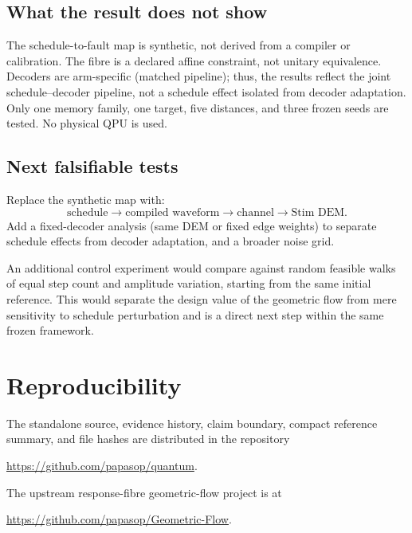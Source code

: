\documentclass[11pt]{article}
\begin{document}
\subsection{What the result does not show}

The schedule-to-fault map is synthetic, not derived from a compiler or calibration. The fibre is a declared affine constraint, not unitary equivalence. Decoders are arm-specific (matched pipeline); thus, the results reflect the joint schedule--decoder pipeline, not a schedule effect isolated from decoder adaptation. Only one memory family, one target, five distances, and three frozen seeds are tested. No physical QPU is used.

\subsection{Next falsifiable tests}
\label{sec:next}

Replace the synthetic map with:
\[
  \text{schedule}\to\text{compiled waveform}\to\text{channel}\to\text{Stim DEM}.
\]
Add a fixed-decoder analysis (same DEM or fixed edge weights) to separate schedule effects from decoder adaptation, and a broader noise grid.

An additional control experiment would compare against random feasible walks of equal step count and amplitude variation, starting from the same initial reference. This would separate the design value of the geometric flow from mere sensitivity to schedule perturbation and is a direct next step within the same frozen framework.

\section{Reproducibility}

The standalone source, evidence history, claim boundary, compact reference summary, and file hashes are distributed in the repository
\begin{center}
\url{https://github.com/papasop/quantum}.
\end{center}
The upstream response-fibre geometric-flow project is at
\begin{center}
\url{https://github.com/papasop/Geometric-Flow}.
\end{center}
\end{document}
